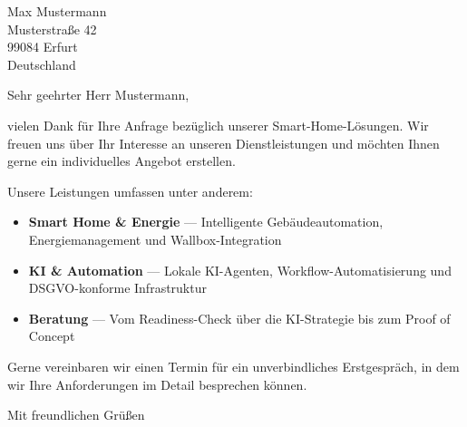 \documentclass{ilmtech-letter}
\begin{document}
\begin{letter}{%
  Max Mustermann\\
  Musterstraße 42\\
  99084 Erfurt\\
  Deutschland%
}

\opening{Sehr geehrter Herr Mustermann,}

vielen Dank für Ihre Anfrage bezüglich unserer Smart-Home-Lösungen. Wir freuen uns
über Ihr Interesse an unseren Dienstleistungen und möchten Ihnen gerne ein individuelles
Angebot erstellen.

Unsere Leistungen umfassen unter anderem:
\begin{itemize}
  \item \textbf{Smart Home \& Energie} — Intelligente Gebäudeautomation, Energiemanagement
        und Wallbox-Integration
  \item \textbf{KI \& Automation} — Lokale KI-Agenten, Workflow-Automatisierung und
        DSGVO-konforme Infrastruktur
  \item \textbf{Beratung} — Vom Readiness-Check über die KI-Strategie bis zum Proof of Concept
\end{itemize}

Gerne vereinbaren wir einen Termin für ein unverbindliches Erstgespräch, in dem wir Ihre
Anforderungen im Detail besprechen können.

\closing{Mit freundlichen Grüßen}


\end{letter}
\end{document}
